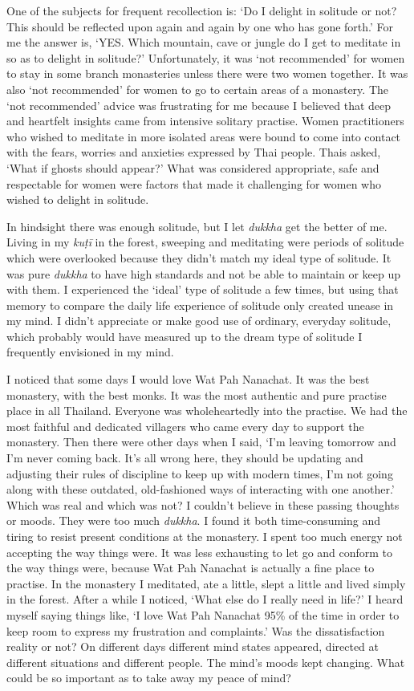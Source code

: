 One of the subjects for frequent recollection is: `Do I delight in
solitude or not? This should be reflected upon again and again by one
who has gone forth.' For me the answer is, `YES. Which mountain, cave or
jungle do I get to meditate in so as to delight in solitude?'
Unfortunately, it was `not recommended' for women to stay in some branch
monasteries unless there were two women together. It was also `not
recommended' for women to go to certain areas of a monastery. The `not
recommended' advice was frustrating for me because I believed that deep
and heartfelt insights came from intensive solitary practise. Women
practitioners who wished to meditate in more isolated areas were bound
to come into contact with the fears, worries and anxieties expressed by
Thai people. Thais asked, `What if ghosts should appear?' What was
considered appropriate, safe and respectable for women were factors that
made it challenging for women who wished to delight in solitude.

In
hindsight there was enough solitude, but I let \emph{dukkha} get the
better of me. Living in my \emph{kuṭī} in the forest, sweeping and
meditating were periods of solitude which were overlooked because they
didn't match my ideal type of solitude. It was pure \emph{dukkha} to
have high standards and not be able to maintain or keep up with them. I
experienced the `ideal' type of solitude a few times, but using that
memory to compare the daily life experience of solitude only created
unease in my mind. I didn't appreciate or make good use of ordinary, 
everyday solitude, which probably would have measured up to the dream
type of solitude I frequently envisioned in my mind. 

I noticed that some days I would love Wat Pah Nanachat. It was the best
monastery, with the best monks. It was the most authentic and pure
practise place in all Thailand. Everyone was wholeheartedly into the
practise. We had the most faithful and dedicated villagers who came
every day to support the monastery. Then there were other days when I
said, `I'm leaving tomorrow and I'm never coming back. It's all wrong
here, they should be updating and adjusting their rules of discipline to
keep up with modern times, I'm not going along with these outdated, 
old-fashioned ways of interacting with one another.' Which was real and
which was not? I couldn't believe in these passing thoughts or moods. 
They were too much \emph{dukkha}. I found it both time-consuming and
tiring to resist present conditions at the monastery. I spent too much
energy not accepting the way things were. It was less exhausting to let
go and conform to the way things were, because Wat Pah Nanachat is
actually a fine place to practise. In the monastery I meditated, ate a
little, slept a little and lived simply in the forest. After a while I
noticed, `What else do I really need in life?' I heard myself saying
things like, `I love Wat Pah Nanachat 95\% of the time in order to keep
room to express my frustration and complaints.' Was the dissatisfaction
reality or not? On different days different mind states appeared, 
directed at different situations and different people. The mind's moods
kept changing. What could be so important as to take away my peace of
mind? 


